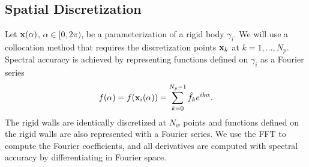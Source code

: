 \documentclass[AMA,STIX1COL]{WileyNJD-v2}
\begin{document}
\subsection{Spatial Discretization}\label{sec:spatial}
Let ${\mathbf{x}}(\alpha)$, $\alpha \in [0,2\pi)$, be a parameterization of a
rigid body $\gamma_i$.  We will use a collocation method that requires
the discretization points ${\mathbf{x}}_k$ at $k=1,\ldots,N_p$.  Spectral
accuracy is achieved by representing functions defined on $\gamma_i$ as
a Fourier series
\begin{align}
  f(\alpha) = f({\mathbf{x}}_i(\alpha)) = 
    \sum_{k = 0}^{N_p-1} \hat{f}_k e^{ik\alpha}.
\end{align}
The rigid walls are identically discretized at $N_w$ points and
functions defined on the rigid walls are also represented with a Fourier
series.  We use the FFT to compute the Fourier coefficients, and all
derivatives are computed with spectral accuracy by differentiating in
Fourier space.
\end{document}
